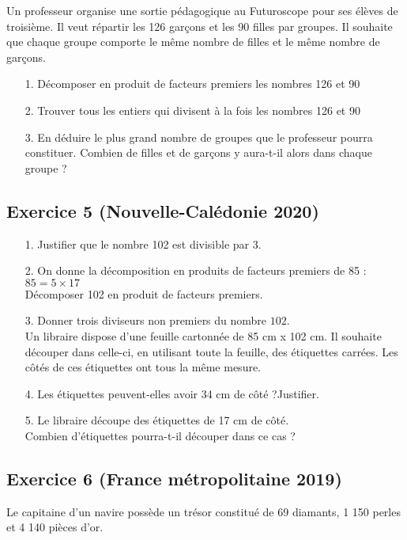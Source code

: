 \documentclass[14 pt]{extarticle}
\theoremstyle{plain}
\begin{document}
 Un professeur organise une sortie pédagogique au Futuroscope pour ses élèves de troisième. Il veut répartir les 126 garçons et les 90 filles par groupes. Il souhaite que chaque groupe comporte le même nombre de filles et le même nombre de garçons.
 
 \begin{itemize}
 \item[1.] Décomposer en produit de facteurs premiers les nombres 126 et 90
 \item[2.] Trouver tous les entiers qui divisent à la fois les nombres 126 et 90
 \item[3.] En déduire le plus grand nombre de groupes que le professeur pourra
constituer. Combien de filles et de garçons y aura-t-il alors dans chaque groupe ?
 \end{itemize}


\subsection*{Exercice 5 (Nouvelle-Calédonie 2020)}

\begin{itemize}
\item[1.] Justifier que le nombre 102 est divisible par 3.
\item[2.] On donne la décomposition en produits de facteurs premiers de 85 : $85 = 5 \times 17$\\
Décomposer 102 en produit de facteurs premiers.
\item[3.] Donner trois diviseurs non premiers du nombre $102$.\\
Un libraire dispose d'une feuille cartonnée de 85 cm x 102 cm.
Il souhaite découper dans celle-ci, en utilisant toute la feuille, des étiquettes carrées. Les côtés de ces étiquettes ont tous la même mesure.
\item[4.] Les étiquettes peuvent-elles avoir 34 cm de côté ?Justifier.

\item[5.] Le libraire découpe des étiquettes de 17 cm de côté. \\
Combien d'étiquettes pourra-t-il découper dans ce cas ?
\end{itemize}


\subsection*{Exercice 6 (France métropolitaine 2019)}

Le capitaine d'un navire possède un trésor constitué de 69 diamants, 1 150 perles et 4 140 pièces d'or.
\end{document}
